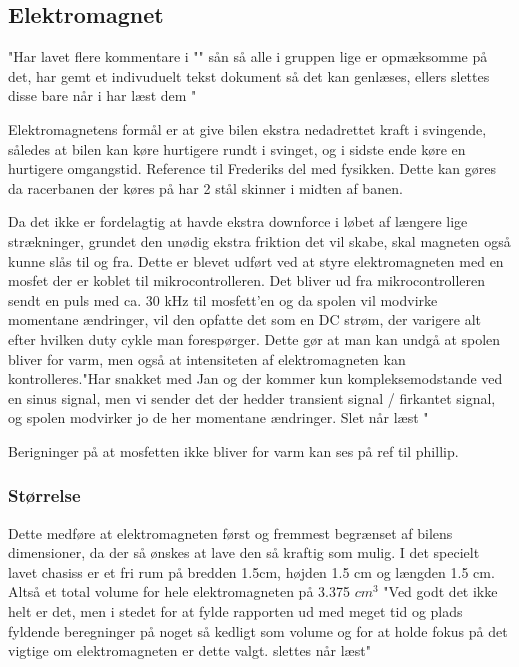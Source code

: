 
\subsection{Elektromagnet}
\label{Elektromagnet}

"Har lavet flere kommentare i "" sån så alle i gruppen lige er opmæksomme på det, har gemt et indivuduelt tekst dokument så det kan genlæses, ellers slettes disse bare når i har læst dem "

Elektromagnetens formål er at give bilen ekstra nedadrettet kraft i svingende, således at bilen kan køre hurtigere rundt i svinget, og i sidste ende køre en hurtigere omgangstid. Reference til Frederiks del med fysikken. Dette kan gøres da racerbanen der køres på har 2 stål skinner i midten af banen.

Da det ikke er fordelagtig at havde ekstra downforce i løbet af længere lige strækninger, grundet den unødig ekstra friktion det vil skabe, skal magneten også kunne slås til og fra. Dette er blevet udført ved at styre elektromagneten med en mosfet der er koblet til mikrocontrolleren. Det bliver ud fra mikrocontrolleren sendt en puls med ca. 30 kHz til mosfett’en og da spolen vil modvirke momentane ændringer, vil den opfatte det som en DC strøm, der varigere alt efter hvilken duty cykle man forespørger. Dette gør at man kan undgå at spolen bliver for varm, men også at intensiteten af elektromagneten kan kontrolleres."Har snakket med Jan og der kommer kun kompleksemodstande ved en sinus signal, men vi sender det der hedder transient signal / firkantet signal, og spolen modvirker jo de her momentane ændringer. Slet når læst "

Berigninger på at mosfetten ikke bliver for varm kan ses på ref til phillip.  

\subsubsection{Størrelse}

Dette medføre at elektromagneten først og fremmest begrænset af bilens dimensioner, da der så ønskes at lave den så kraftig som mulig. I det specielt lavet chasiss er et fri rum på bredden 1.5cm, højden 1.5 cm og længden 1.5 cm. Altså et total volume for hele elektromagneten på 3.375 $cm^3$ "Ved godt det ikke helt er det, men i stedet for at fylde rapporten ud med meget tid og plads fyldende beregninger på noget så kedligt som volume og for at holde fokus på det vigtige om elektromagneten er dette valgt. slettes når læst" 

